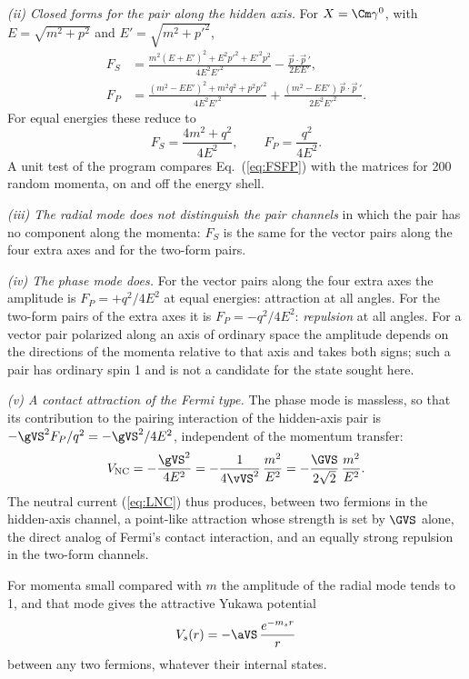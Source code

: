 \emph{(ii) Closed forms for the pair along the hidden axis.} For $X=\Cm\gamma^0$, with
$E=\sqrt{m^2+p^2}$ and $E'=\sqrt{m^2+p'^2}$,
\begin{align}
F_S&=\frac{m^2(E+E')^2+E^2p'^2+E'^2p^2}{4E^2E'^2}-\frac{\vec p\cdot\vec p\,'}{2EE'},\nonumber\\
F_P&=\frac{(m^2-EE')^2+m^2q^2+p^2p'^2}{4E^2E'^2}+\frac{(m^2-EE')\,\vec p\cdot\vec p\,'}{2E^2E'^2}.
\label{eq:FSFP}
\end{align}
For equal energies these reduce to
\begin{equation}
F_S=\frac{4m^2+q^2}{4E^2},\qquad F_P=\frac{q^2}{4E^2}.
\label{eq:FSFPequal}
\end{equation}
A unit test of the program compares Eq.~(\ref{eq:FSFP}) with the matrices for 200 random momenta, on
and off the energy shell.

\emph{(iii) The radial mode does not distinguish the pair channels} in which the pair has no
component along the momenta: $F_S$ is the same for the vector pairs along the four extra axes and for
the two-form pairs.

\emph{(iv) The phase mode does.} For the vector pairs along the four extra axes the amplitude is
$F_P=+q^2/4E^2$ at equal energies: attraction at all angles. For the two-form pairs of the extra axes
it is $F_P=-q^2/4E^2$: \emph{repulsion} at all angles. For a vector pair polarized along an axis of
ordinary space the amplitude depends on the directions of the momenta relative to that axis and takes
both signs; such a pair has ordinary spin 1 and is not a candidate for the state sought here.

\emph{(v) A contact attraction of the Fermi type.} The phase mode is massless, so that its
contribution to the pairing interaction of the hidden-axis pair is $-\gVS^2F_P/q^2=-\gVS^2/4E^2$,
independent of the momentum transfer:
\begin{equation}
V_{\rm NC}=-\frac{\gVS^2}{4E^2}=-\frac{1}{4\vVS^2}\,\frac{m^2}{E^2}=-\frac{\GVS}{2\sqrt2}\,\frac{m^2}{E^2}.
\label{eq:VNC}
\end{equation}
The neutral current (\ref{eq:LNC}) thus produces, between two fermions in the hidden-axis channel, a
point-like attraction whose strength is set by $\GVS$ alone, the direct analog of Fermi's contact
interaction, and an equally strong repulsion in the two-form channels.

For momenta small compared with $m$ the amplitude of the radial mode tends to 1, and that mode gives
the attractive Yukawa potential
\begin{equation}
V_s(r)=-\aVS\,\frac{e^{-m_sr}}{r}
\label{eq:yukawa}
\end{equation}
between any two fermions, whatever their internal states.

